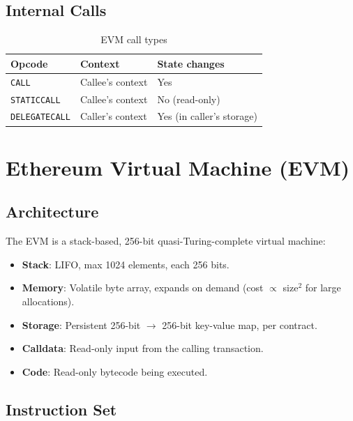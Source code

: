 \documentclass[12pt,a4paper,openany]{book}
\theoremstyle{definition}
\theoremstyle{plain}
\theoremstyle{remark}
\begin{document}
\section{Internal Calls}

\begin{table}[h]
\centering
\caption{EVM call types}
\begin{tabular}{lll}
\toprule
\textbf{Opcode} & \textbf{Context} & \textbf{State changes} \\
\midrule
\texttt{CALL}         & Callee's context & Yes \\
\texttt{STATICCALL}   & Callee's context & No (read-only) \\
\texttt{DELEGATECALL} & Caller's context & Yes (in caller's storage) \\
\bottomrule
\end{tabular}
\end{table}


\chapter{Ethereum Virtual Machine (EVM)}
\label{chap:evm}

\section{Architecture}

The EVM is a stack-based, 256-bit quasi-Turing-complete virtual machine:

\begin{itemize}
  \item \textbf{Stack}: LIFO, max 1024 elements, each 256 bits.
  \item \textbf{Memory}: Volatile byte array, expands on demand (cost $\propto$ size$^2$ for large allocations).
  \item \textbf{Storage}: Persistent 256-bit $\to$ 256-bit key-value map, per contract.
  \item \textbf{Calldata}: Read-only input from the calling transaction.
  \item \textbf{Code}: Read-only bytecode being executed.
\end{itemize}

\section{Instruction Set}
\end{document}
